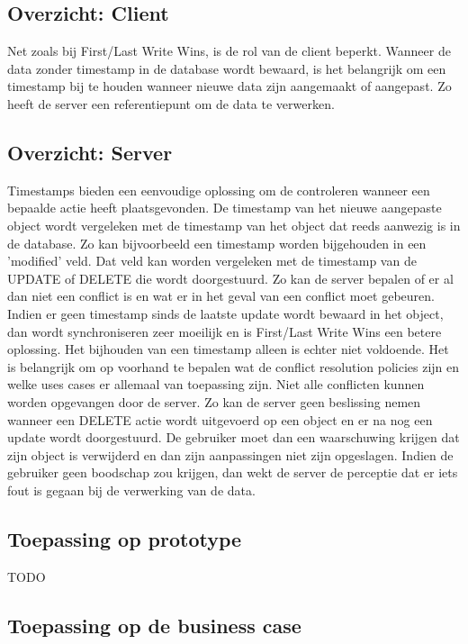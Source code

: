 \subsection{Overzicht: Client}
Net zoals bij First/Last Write Wins, is de rol van de client beperkt. Wanneer de data zonder timestamp in de database wordt bewaard, is het belangrijk om een timestamp bij te houden wanneer nieuwe data zijn aangemaakt of aangepast. Zo heeft de server een referentiepunt om de data te verwerken.
\subsection{Overzicht: Server}
Timestamps bieden een eenvoudige oplossing om de controleren wanneer een bepaalde actie heeft plaatsgevonden. De timestamp van het nieuwe aangepaste object wordt vergeleken met de timestamp van het object dat reeds aanwezig is in de database. Zo kan bijvoorbeeld een timestamp worden bijgehouden in een 'modified' veld. Dat veld kan worden vergeleken met de timestamp van de UPDATE of DELETE die wordt doorgestuurd. Zo kan de server bepalen of er al dan niet een conflict is en wat er in het geval van een conflict moet gebeuren. Indien er geen timestamp sinds de laatste update wordt bewaard in het object, dan wordt synchroniseren zeer moeilijk en is First/Last Write Wins een betere oplossing. Het bijhouden van een timestamp alleen is echter niet voldoende. Het is belangrijk om op voorhand te bepalen wat de conflict resolution policies zijn en welke uses cases er allemaal van toepassing zijn. Niet alle conflicten kunnen worden opgevangen door de server. Zo kan de server geen beslissing nemen wanneer een DELETE actie wordt uitgevoerd op een object en er na nog een update wordt doorgestuurd. De gebruiker moet dan een waarschuwing krijgen dat zijn object is verwijderd en dan zijn aanpassingen niet zijn opgeslagen. Indien de gebruiker geen boodschap zou krijgen, dan wekt de server de perceptie dat er iets fout is gegaan bij de verwerking van de data.
\subsection{Toepassing op prototype}
TODO
\subsection{Toepassing op de business case}
